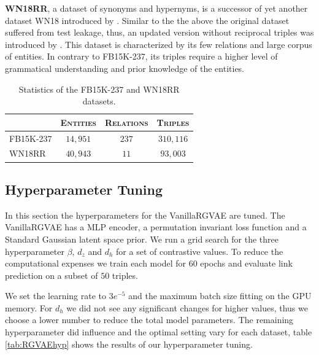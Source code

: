 

\textbf{WN18RR}, a dataset of synonyms and hypernyms, is a successor of yet another dataset WN18 introduced by \cite{bordes_translating_2013}. Similar to the the above the original dataset suffered from test leakage, thus, an updated version without reciprocal triples was introduced by \cite{dettmers_convolutional_2018}. This dataset is characterized by its few relations and large corpus of entities. In contrary to FB15K-237, its triples require a higher level of grammatical understanding and prior knowledge of the entities. 



\begin{table}[H]
  \centering
      \begin{tabular}{|l|l|l|l|}
      \hline
      \rowcolor[HTML]{EFEFEF}
      \multicolumn{1}{|c}{\textsc{Dataset}} & \multicolumn{1}{c}{\textsc{Entities}} & \multicolumn{1}{c}{\textsc{Relations}} & \multicolumn{1}{c|}{\textsc{Triples}}\\\hline
      FB15K-237     & \multicolumn{1}{c|}{$14,951$} & \multicolumn{1}{c|}{$237$} & \multicolumn{1}{c|}{$310,116$}\\
      WN18RR   & \multicolumn{1}{c|}{$40,943$} & \multicolumn{1}{c|}{$11$} & \multicolumn{1}{c|}{$93,003$} \\
      \hline
      \end{tabular}
      \caption{Statistics of the FB15K-237 \cite{toutanova_representing_2015} and WN18RR \cite{dettmers_convolutional_2018} datasets.}
      \label{tab5:data}
  \end{table}


\subsection{Hyperparameter Tuning}

In this section the hyperparameters for the VanillaRGVAE are tuned. The VanillaRGVAE has a MLP encoder, a permutation invariant loss function and a Standard Gaussian latent space prior. We run a grid search for the three hyperparameter $\beta$, $d_z$ and $d_h$ for a set of contrastive values. To reduce the computational expenses we train each model for $60$ epochs and  evaluate link prediction on a subset of $50$ triples.

We set the learning rate to $3e^{-5}$ and the maximum batch size fitting on the GPU memory. For $d_h$ we did not see any significant changes for higher values, thus we choose a lower number to reduce the total model parameters. The remaining hyperparameter did influence and the optimal setting vary for each dataset, table \ref{tab:RGVAEhyp} shows the results of our hyperparameter tuning.

